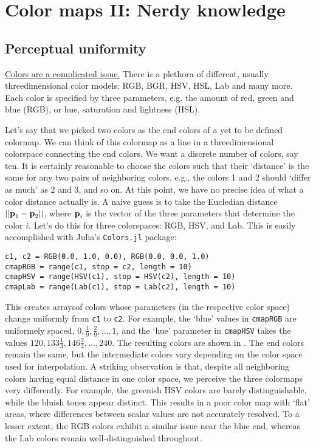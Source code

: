 \section{Color maps II: Nerdy knowledge}
\subsection{Perceptual uniformity}\label{sec:perceptualuniform}
\href{https://xkcd.com/1882/}{Colors are a complicated issue.} There is a plethora of different, usually threedimensional color models: RGB, BGR, HSV, HSL, Lab and many more. Each color is specified by three parameters, e.g. the amount of red, green and blue (RGB), or hue, saturation and lightness (HSL).   

Let's say that we picked two colors as the end colors of a yet to be defined colormap. We can think of this colormap as a line in a threedimensional colorspace connecting the end colors. We want a discrete number of colors, say ten. It is certainly reasonable to choose the colors such that their `distance' is the same for any two pairs of neighboring colors, e.g., the colors 1 and 2 should `differ as much' as 2 and 3, and so on. At this point, we have no precise idea of what a color distance actually is. A naive guess is to take the Eucledian distance $||\textbf{p}_1-\textbf{p}_2||$, where $\textbf{p}_i$ is the vector of the three parameters that determine the color $i$.  Let's do this for three colorspaces: RGB, HSV, and Lab. This is easily accomplished with Julia's \verb|Colors.jl| package:

\begin{listing}[h]
\begin{verbatim} 
c1, c2 = RGB(0.0, 1.0, 0.0), RGB(0.0, 0.0, 1.0)
cmapRGB = range(c1, stop = c2, length = 10) 
cmapHSV = range(HSV(c1), stop = HSV(c2), length = 10) 
cmapLab = range(Lab(c1), stop = Lab(c2), length = 10) 
\end{verbatim}
\end{listing}

This creates arraysof colors whose parameters (in the respective color space) change uniformly from \verb|c1| to \verb|c2|. For example, the `blue' values in \verb|cmapRGB| are uniformely spaced, $0,\frac{1}{9},\frac{2}{9},\ldots,1$, and the `hue' parameter in \verb|cmapHSV| takes the values $120,133\frac{1}{3},146\frac{2}{3},\ldots,240$.
The resulting colors are shown in . 
The end colors remain the same, but the intermediate colors vary depending on the color space used for interpolation. A striking observation is that, despite all neighboring colors having equal distance in one color space, we perceive the three colormaps very differently. For example, the greenish HSV colors are barely distinguishable, while the bluish tones appear distinct. This results in a poor color map with `flat' areas, where differences between scalar values are not accurately resolved. To a lesser extent, the RGB colors exhibit a similar issue near the blue end, whereas the Lab colors remain well-distinguished throughout.

